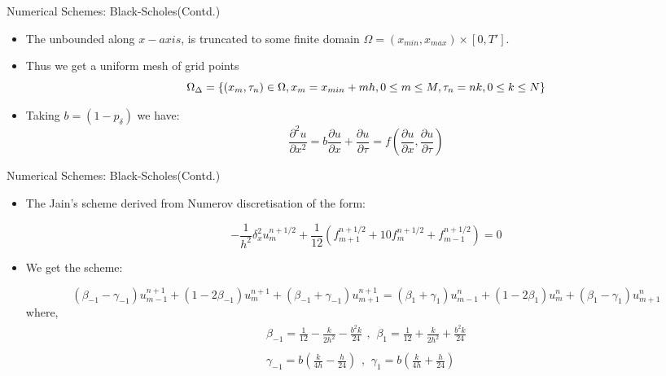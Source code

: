 \documentclass{beamer}
\begin{document}
\begin{frame}{Numerical Schemes: Black-Scholes(Contd.)}
    \begin{itemize}
        \item The unbounded along $x-axis$, is truncated to some finite domain $\Omega = (x_{min}, x_{max})\times [0, T']$.
        \item Thus we get a uniform mesh of grid points
\begin{equation*}
    \Omega_{\Delta} = \{(x_{m},\tau_{n}) \in \Omega, x_{m}=x_{min}+mh, 0\le m \le M, \\ \tau_{n}=nk, 0\le k \le N\}
\end{equation*}
\item Taking $b=(1-p_{\delta})$ we have:
\begin{equation*}
    \frac{\partial^{2}u}{\partial x^{2}} = b\frac{\partial u}{\partial x} + \frac{\partial u}{\partial \tau} = f(\frac{\partial u}{\partial x}, \frac{\partial u}{\partial \tau})  
\end{equation*}
    \end{itemize}
\end{frame}
\begin{frame}{Numerical Schemes: Black-Scholes(Contd.)}
\begin{itemize}
    \item The Jain's scheme derived from Numerov discretisation of the form:
 
\begin{equation*}
-\frac{1}{h^{2}}\delta_{x}^{2}u_{m}^{n+1/2}+\frac{1}{12}(f_{m+1}^{n+1/2}+10f_{m}^{n+1/2}+f_{m-1}^{n+1/2})=0
\end{equation*}
\item We get the scheme:
 
\begin{equation*}
    (\beta_{-1}-\gamma_{-1})u_{m-1}^{n+1}+(1-2\beta_{-1})u_{m}^{n+1}+(\beta_{-1}+\gamma_{-1})u_{m+1}^{n+1} = (\beta_{1}+\gamma_{1})u_{m-1}^{n}+(1-2\beta_{1})u_{m}^{n}+(\beta_{1}-\gamma_{1})u_{m+1}^{n}
\end{equation*}
where,
\begin{align*}
    \begin{split}
        \beta_{-1} = \frac{1}{12}-\frac{k}{2h^{2}}-\frac{b^{2}k}{24}
    \end{split}, 
    \begin{split}
        \beta_{1} = \frac{1}{12}+\frac{k}{2h^{2}}+\frac{b^{2}k}{24}
    \end{split}\\
    \begin{split}
        \gamma_{-1} = b(\frac{k}{4h}-\frac{h}{24})
    \end{split},
    \begin{split}
        \gamma_{1} = b(\frac{k}{4h}+\frac{h}{24})
    \end{split}
\end{align*}
\end{itemize}
 
\end{frame}
 
\end{document}
